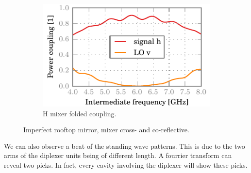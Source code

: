 \begin{figure}[hbtp]
    \\
    \begin{subfigure}[b]{.5\textwidth}
        \includegraphics{chapter_3/09_badrt_mhcrco_h_ssb}%
        \caption{H mixer folded coupling.}
    \end{subfigure}%
    \caption{Imperfect rooftop mirror, mixer cross- and co-reflective.}
    \label{fig:09_badrt_mhcrco}
\end{figure}

We can also observe a beat of the standing wave patterns.  This is due to the two arms of the diplexer units being of different length.  A fourrier transform can reveal two picks.
In fact, every cavity involving the diplexer will show these picks.

\clearpage
